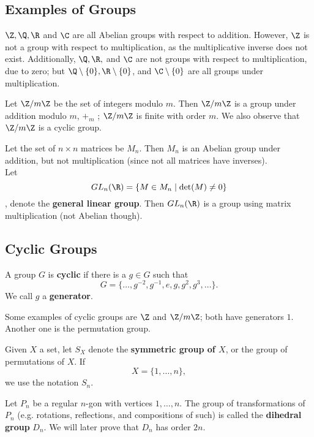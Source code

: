 \documentclass[math1530-lecture-notes]{subfiles}
\begin{document}
\subsection{Examples of Groups}
\begin{example}
  $\Z,\Q,\R$ and $\C$ are all Abelian groups with respect to addition. However, $\Z$ is not a group
  with respect to multiplication, as the multiplicative inverse does not exist. Additionally,
  $\Q,\R,$ and $\C$ are not groups with respect to multiplication, due to zero; but $\Q\setminus \{
  0\}, \R\setminus \{ 0 \}$, and $ \C\setminus \{ 0 \}$ are all groups under multiplication.
\end{example}

\begin{example}
  Let $\Z/m\Z$ be the set of integers modulo $m$. Then  $\Z / m\Z$ is a group under addition
  modulo $m$, $+_m$ ; $\Z / m\Z$ is finite with order $m$. We also observe that $\Z/m\Z$ is a cyclic
  group.
\end{example}

\begin{example}
  Let the set of $n\times n$ matrices be $M_n$. Then  $M_n$ is an Abelian group under addition, but
  not multiplication (since not all matrices have inverses).\\

  Let \[GL_n(\R)=\{M\in M_n\mid \det(M)\neq 0\}\], denote the \textbf{general linear group}. Then
  $GL_n(\R)$ is a group using matrix multiplication (not Abelian though).
\end{example}


\subsection{Cyclic Groups}
\begin{definition}{}
  A group $G$ is \textbf{cyclic} if there is a $g\in G$ such that \[
    G=\{ \ldots,g^{-2},g^{-1} ,e,g,g^2,g^3,\ldots\}
  .\] We call $g$ a \textbf{generator}.
\end{definition}

Some examples of cyclic groups are $\Z$ and $\Z / m\Z$; both have generators $1$. Another one is
the permutation group.
\begin{definition}{}
  Given $X$ a set, let $S_X$ denote the  \textbf{symmetric group of $X$}, or the group of
  permutations of $X$. If  \[
    X=\{ 1,\ldots,n \}
  ,\] we use the notation $S_n$.

  Let $P_n$ be a regular  $n$-gon with vertices $1,\ldots,n$. The group of transformations of $P_n$
  (e.g. rotations, reflections, and compositions of such) is called the  \textbf{dihedral group}
  $D_n$. We will later prove that $D_n$ has order  $2n$.
\end{definition}
\end{document}
